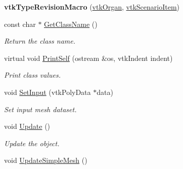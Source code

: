 \begin{DoxyCompactItemize}
\item 
\hypertarget{classvtkOrgan_aaaf057c35a17a65fa1c95f8cfb6d86f2}{
{\bfseries vtkTypeRevisionMacro} (\hyperlink{classvtkOrgan}{vtkOrgan}, \hyperlink{classvtkScenarioItem}{vtkScenarioItem})}
\label{classvtkOrgan_aaaf057c35a17a65fa1c95f8cfb6d86f2}

\item 
\hypertarget{classvtkOrgan_a5938d264f154f3a9357388f809bb3914}{
const char $\ast$ \hyperlink{classvtkOrgan_a5938d264f154f3a9357388f809bb3914}{GetClassName} ()}
\label{classvtkOrgan_a5938d264f154f3a9357388f809bb3914}

\begin{DoxyCompactList}\small\item\em Return the class name. \item\end{DoxyCompactList}\item 
\hypertarget{classvtkOrgan_ad4f07f094056b7161bcdf4edec7f82d2}{
virtual void \hyperlink{classvtkOrgan_ad4f07f094056b7161bcdf4edec7f82d2}{PrintSelf} (ostream \&os, vtkIndent indent)}
\label{classvtkOrgan_ad4f07f094056b7161bcdf4edec7f82d2}

\begin{DoxyCompactList}\small\item\em Print class values. \item\end{DoxyCompactList}\item 
void \hyperlink{classvtkOrgan_a63ce9adb7313bce4dc8aa547ba6736fc}{SetInput} (vtkPolyData $\ast$data)
\begin{DoxyCompactList}\small\item\em Set input mesh dataset. \item\end{DoxyCompactList}\item 
\hypertarget{classvtkOrgan_a267da8ba8d4cfcef50b70dc5b9d19ae9}{
void \hyperlink{classvtkOrgan_a267da8ba8d4cfcef50b70dc5b9d19ae9}{Update} ()}
\label{classvtkOrgan_a267da8ba8d4cfcef50b70dc5b9d19ae9}

\begin{DoxyCompactList}\small\item\em Update the object. \item\end{DoxyCompactList}\item 
\hypertarget{classvtkOrgan_a943994fbb1b4f8a8e72f647f631cdd81}{
void \hyperlink{classvtkOrgan_a943994fbb1b4f8a8e72f647f631cdd81}{UpdateSimpleMesh} ()}
\label{classvtkOrgan_a943994fbb1b4f8a8e72f647f631cdd81}


\end{DoxyCompactItemize}
